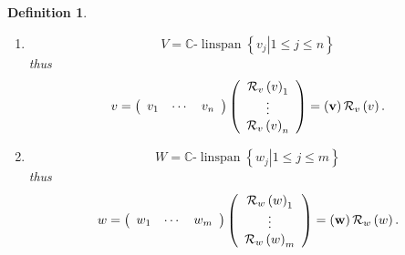 \documentclass[aps,preprint]{revtex4}%
\newtheorem{definition}[theorem]{Definition}
\begin{document}
\begin{definition}
\begin{enumerate}
\item
\begin{equation}
V=\mathbb{C}\text{-}\operatorname*{linspan}\left\{  \left.  v_{j}\right\vert
1\leq j\leq n\right\}
\end{equation}
thus
\begin{equation}
v=\left(
\begin{array}
[c]{ccc}%
v_{1} & \cdots & v_{n}%
\end{array}
\right)  \left(
\begin{array}
[c]{c}%
\mathcal{R}_{v}\left(  v\right)  _{1}\\
\vdots\\
\mathcal{R}_{v}\left(  v\right)  _{n}%
\end{array}
\right)  =\left(  \mathbf{v}\right)  \mathcal{R}_{v}\left(  v\right)  .
\end{equation}


\item
\begin{equation}
W=\mathbb{C}\text{-}\operatorname*{linspan}\left\{  \left.  w_{j}\right\vert
1\leq j\leq m\right\}
\end{equation}
thus
\begin{equation}
w=\left(
\begin{array}
[c]{ccc}%
w_{1} & \cdots & w_{m}%
\end{array}
\right)  \left(
\begin{array}
[c]{c}%
\mathcal{R}_{w}\left(  w\right)  _{1}\\
\vdots\\
\mathcal{R}_{w}\left(  w\right)  _{m}%
\end{array}
\right)  =\left(  \mathbf{w}\right)  \mathcal{R}_{w}\left(  w\right)  .
\end{equation}



\end{enumerate}
\end{definition}
\end{document}
